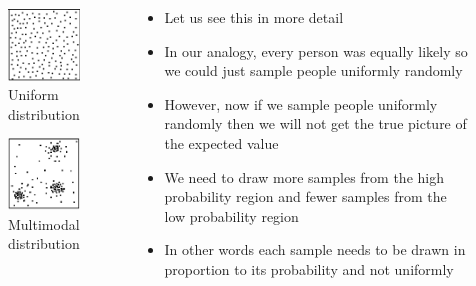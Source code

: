 \begin{frame}
	\begin{columns}
		\begin{overlayarea}{\textwidth}{\textheight}
			\centering
			\begin{figure}
				\includegraphics[scale=0.4]{images/Uniform-dist.png}
				\caption{Uniform distribution}
			\end{figure}
			\begin{figure}
				\includegraphics[scale=0.4]{images/Multimodal-dist.png}
				\caption{Multimodal distribution}
			\end{figure}
		\end{overlayarea}
		\begin{overlayarea}{\textwidth}{\textheight}
			\begin{itemize}
				\item<1-> Let us see this in more detail
				\item<2-> In our analogy, every person was equally likely so we could just sample people uniformly randomly
				\item<3-> However, now if we sample people uniformly randomly then we will not get the true picture of the expected value
				\item<4-> We need to draw more samples from the high probability region and fewer samples from the low probability region
				\item<5-> In other words each sample needs to be drawn in proportion to its probability and not uniformly
			\end{itemize}
		\end{overlayarea}
	\end{columns}
\end{frame}



